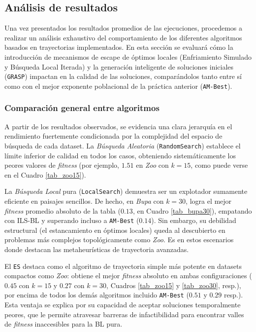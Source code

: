 \documentclass[a4paper,12pt]{article}%
\begin{document}
\subsection{Análisis de resultados}

\noindent Una vez presentados los resultados promedios de las ejecuciones, procedemos a realizar un análisis exhaustivo del comportamiento de los diferentes algoritmos basados en trayectorias implementados. En esta sección se evaluará cómo la introducción de mecanismos de escape de óptimos locales (Enfriamiento Simulado y Búsqueda Local Iterada) y la generación inteligente de soluciones iniciales (\texttt{GRASP}) impactan en la calidad de las soluciones, comparándolos tanto entre sí como con el mejor exponente poblacional de la práctica anterior (\texttt{AM-Best}).

\subsubsection{Comparación general entre algoritmos}

\noindent A partir de los resultados observados, se evidencia una clara jerarquía en el rendimiento fuertemente condicionada por la complejidad del espacio de búsqueda de cada dataset. La \textit{Búsqueda Aleatoria} (\texttt{RandomSearch}) establece el límite inferior de calidad en todos los casos, obteniendo sistemáticamente los peores valores de \textit{fitness} (por ejemplo, $1.51$ en \textit{Zoo} con $k=15$, como puede verse en el Cuadro \ref{tab_zoo15}). 

La \textit{Búsqueda Local} pura (\texttt{LocalSearch}) demuestra ser un explotador sumamente eficiente en paisajes sencillos. De hecho, en \textit{Bupa} con $k=30$, logra el mejor \textit{fitness} promedio absoluto de la tabla ($0.13$, en Cuadro \ref{tab_bupa30}), empatando con ILS-BL y superando incluso a \texttt{AM-Best} ($0.14$). Sin embargo, su debilidad estructural (el estancamiento en óptimos locales) queda al descubierto en problemas más complejos topológicamente como \textit{Zoo}. Es en estos escenarios donde destacan las metaheurísticas de trayectoria avanzadas.

El \texttt{ES} destaca como el algoritmo de trayectoria simple más potente en datasets compactos como \textit{Zoo}: obtiene el mejor \textit{fitness} absoluto en ambas configuraciones ($0.45$ con $k=15$ y $0.27$ con $k=30$, Cuadros \ref{tab_zoo15} y \ref{tab_zoo30}, resp.), por encima de todos los demás algoritmos incluido \texttt{AM-Best} ($0.51$ y $0.29$ resp.). Esta ventaja se explica por su capacidad de aceptar soluciones temporalmente peores, que le permite atravesar barreras de infactibilidad para encontrar valles de \textit{fitness} inaccesibles para la BL pura.
\end{document}
